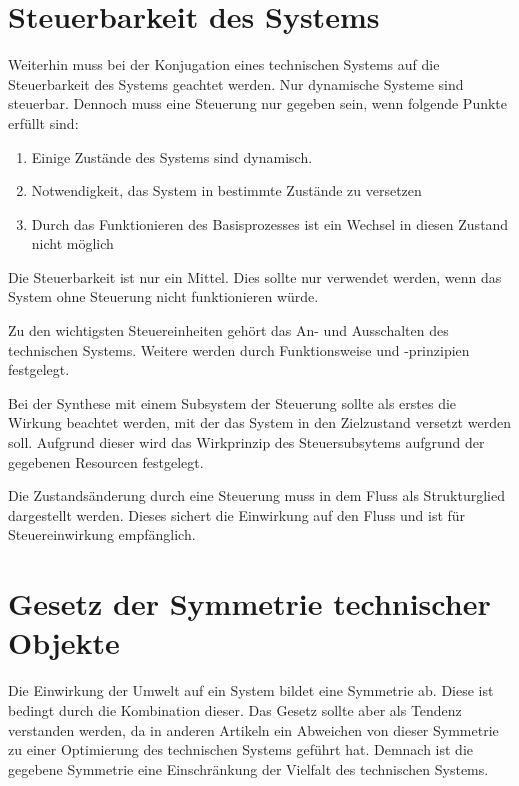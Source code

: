 \documentclass[11pt,a4paper]{article}
\begin{document}
\section{Steuerbarkeit des Systems}

Weiterhin muss bei der Konjugation eines technischen Systems auf die
Steuerbarkeit des Systems geachtet werden.  Nur dynamische Systeme sind
steuerbar.  Dennoch muss eine Steuerung nur gegeben sein, wenn folgende Punkte
erfüllt sind:

\begin{enumerate}[noitemsep]
\item Einige Zustände des Systems sind dynamisch.
\item Notwendigkeit, das System in bestimmte Zustände zu versetzen
\item Durch das Funktionieren des Basisprozesses ist ein Wechsel in diesen
  Zustand nicht möglich
\end{enumerate}

Die Steuerbarkeit ist nur ein Mittel.  Dies sollte nur verwendet werden, wenn
das System ohne Steuerung nicht funktionieren würde.

Zu den wichtigsten Steuereinheiten gehört das An- und Ausschalten des
technischen Systems.  Weitere werden durch Funktionsweise und -prinzipien
festgelegt.

Bei der Synthese mit einem Subsystem der Steuerung sollte als erstes die
Wirkung beachtet werden, mit der das System in den Zielzustand versetzt werden
soll.  Aufgrund dieser wird das Wirkprinzip des Steuersubsytems aufgrund der
gegebenen Resourcen festgelegt.

Die Zustandsänderung durch eine Steuerung muss in dem Fluss als Strukturglied
dargestellt werden.  Dieses sichert die Einwirkung auf den Fluss und ist für
Steuereinwirkung empfänglich.

\section{Gesetz der Symmetrie technischer Objekte}

Die Einwirkung der Umwelt auf ein System bildet eine Symmetrie ab.  Diese ist
bedingt durch die Kombination dieser.  Das Gesetz sollte aber als Tendenz
verstanden werden, da in anderen Artikeln ein Abweichen von dieser Symmetrie
zu einer Optimierung des technischen Systems geführt hat.  Demnach ist die
gegebene Symmetrie eine Einschränkung der Vielfalt des technischen Systems.
\end{document}
